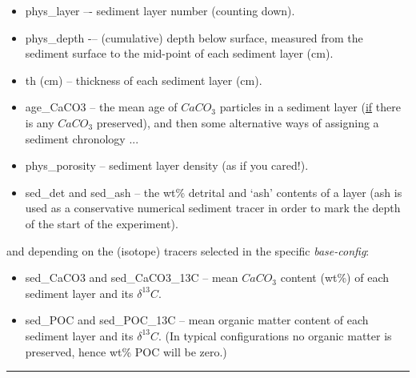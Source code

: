\vspace{1mm}
\begin{itemize}[noitemsep]
\item \textsf{\footnotesize phys\_layer } –- sediment layer number (counting down).
\item \textsf{\footnotesize phys\_depth } -– (cumulative) depth below surface, measured from the sediment surface to the mid-point of each sediment layer (cm).
\item \textsf{\footnotesize th (cm) } -- thickness of each sediment layer (cm).
\item \textsf{\footnotesize age\_CaCO3 } -- the mean age of \(CaCO_{3}\) particles in a sediment layer (\uline{if} there is any \(CaCO_{3}\) preserved), and then some alternative ways of assigning a sediment chronology ...
\item \textsf{\footnotesize phys\_porosity  } -- sediment layer density (as if you cared!).
\item \textsf{\footnotesize sed\_det } and \textsf{\footnotesize sed\_ash } -- the wt\% detrital and ‘ash’ contents of a layer (ash is used as a conservative numerical sediment tracer in order to mark the depth of the start of the experiment).
\end{itemize}
\vspace{1mm}
and depending on the (isotope) tracers selected in the specific \textit{base-config}:
\vspace{1mm}
\begin{itemize}[noitemsep]
\item \textsf{\footnotesize sed\_CaCO3} and \textsf{\footnotesize sed\_CaCO3\_13C } -- mean \(CaCO_{3}\) content (wt\%) of each sediment layer and its \(\delta^{13} C\).
\item \textsf{\footnotesize sed\_POC } and \textsf{\footnotesize sed\_POC\_13C } -- mean organic matter content of each sediment layer and its \(\delta^{13} C\). (In typical configurations no organic matter is preserved, hence wt\% POC will be zero.)
\end{itemize}

\vspace{1mm}\noindent\rule{4cm}{0.1mm}\vspace{2mm}


